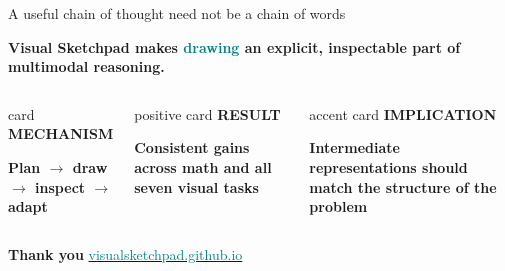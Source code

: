 \documentclass[10pt,aspectratio=169]{beamer}
\newcommand{\eyebrow}[1]{%
  {\color{Teal}\bfseries\fontsize{8}{9.5}\selectfont\MakeUppercase{#1}}%
}
\begin{document}
\begin{frame}{A useful chain of thought need not be a chain of words}
  \vspace{0.14cm}
  \begin{center}
    {\fontsize{12}{16}\selectfont\bfseries
     Visual Sketchpad makes \textcolor{Teal}{drawing} an explicit,
     inspectable part of multimodal reasoning.}
  \end{center}
  \vspace{0.26cm}
  \begin{columns}[T,onlytextwidth]
      \begin{beamercolorbox}[rounded=true,wd=\linewidth,ht=2.35cm,dp=0.15cm,sep=0.27cm]{card}
        \eyebrow{Mechanism}\par\vspace{0.14cm}
        \textbf{Plan $\rightarrow$ draw $\rightarrow$ inspect $\rightarrow$ adapt}
      \end{beamercolorbox}
      \begin{beamercolorbox}[rounded=true,wd=\linewidth,ht=2.35cm,dp=0.15cm,sep=0.27cm]{positive card}
        \eyebrow{Result}\par\vspace{0.14cm}
        \textbf{Consistent gains across math and all seven visual tasks}
      \end{beamercolorbox}
      \begin{beamercolorbox}[rounded=true,wd=\linewidth,ht=2.35cm,dp=0.15cm,sep=0.27cm]{accent card}
        \eyebrow{Implication}\par\vspace{0.14cm}
        \textbf{Intermediate representations should match the structure of the problem}
      \end{beamercolorbox}
  \end{columns}
  \vspace{0.55cm}
  \begin{center}
    {\small\bfseries Thank you}\qquad
    \href{https://visualsketchpad.github.io/}{\textcolor{Teal}{visualsketchpad.github.io}}
  \end{center}
\end{frame}

\end{document}
